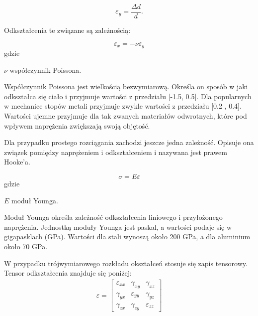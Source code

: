 \begin{equation}
\varepsilon_y=\frac{\Delta d}{d}.
\end{equation}

	Odkształcenia te związane są zależnością:

\begin{equation}
\varepsilon_x=-\nu \varepsilon_y
\end{equation}
gdzie
\begin{eqwhere}[2cm]
        \item[$\nu$] współczynnik Poissona.
\end{eqwhere}

	Współczynnik Poissona jest wielkością bezwymiarową. Określa on sposób w jaki odkształca się ciało i przyjmuje wartości z przedziału [-1.5, 0.5]. Dla popularnych w mechanice stopów metali przyjmuje zwykle wartości z przedziału [0.2 , 0.4]. Wartości ujemne przyjmuje dla tak zwanych materiałów odwrotnych, które pod wpływem naprężenia zwiększają swoją objętość.

	Dla przypadku prostego rozciągania zachodzi jeszcze jedna zależność. Opisuje ona związek pomiędzy naprężeniem i odkształceniem i nazywana jest prawem Hooke'a.

\begin{equation}
\sigma=E\varepsilon
\end{equation}
gdzie
\begin{eqwhere}[2cm]
        \item[$E$] moduł Younga.
\end{eqwhere}

	Moduł Younga określa zależność odkształcenia liniowego i przyłożonego naprężenia. Jednostką moduły Younga jest paskal, a wartości podaje się w gigapasklach (GPa). Wartości dla stali wynoszą około 200 GPa, a dla aluminium około 70 GPa.

	W przypadku trójwymiarowego rozkładu okształceń stosuje się zapis tensorowy. Tensor odkształcenia znajduje się poniżej:
\begin{gather}
	\varepsilon=\begin{bmatrix} 
	  \varepsilon_{xx}    & \gamma_{xy} & \gamma_{xz} \\ 
	  \gamma_{yx} & \varepsilon_{yy} & \gamma_{yz} \\
	  \gamma_{zx} & \gamma_{zy} & \varepsilon_{zz} 
	\end{bmatrix}
\end{gather}


